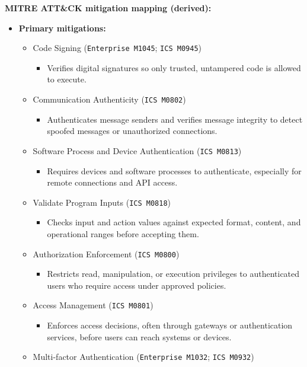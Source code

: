 \documentclass[10pt,a4paper,oneside]{report}
\begin{document}
\textbf{MITRE ATT\&CK mitigation mapping (derived):}

\begin{itemize}
\item \textbf{Primary mitigations:}
\begin{itemize}
\item Code Signing (\texttt{Enterprise M1045}; \texttt{ICS M0945})
\begin{itemize}
\item Verifies digital signatures so only trusted, untampered code is allowed to execute.
\end{itemize}
\item Communication Authenticity (\texttt{ICS M0802})
\begin{itemize}
\item Authenticates message senders and verifies message integrity to detect spoofed messages or unauthorized connections.
\end{itemize}
\item Software Process and Device Authentication (\texttt{ICS M0813})
\begin{itemize}
\item Requires devices and software processes to authenticate, especially for remote connections and API access.
\end{itemize}
\item Validate Program Inputs (\texttt{ICS M0818})
\begin{itemize}
\item Checks input and action values against expected format, content, and operational ranges before accepting them.
\end{itemize}
\item Authorization Enforcement (\texttt{ICS M0800})
\begin{itemize}
\item Restricts read, manipulation, or execution privileges to authenticated users who require access under approved policies.
\end{itemize}
\item Access Management (\texttt{ICS M0801})
\begin{itemize}
\item Enforces access decisions, often through gateways or authentication services, before users can reach systems or devices.
\end{itemize}
\item Multi-factor Authentication (\texttt{Enterprise M1032}; \texttt{ICS M0932})
\begin{itemize}

\end{itemize}
\end{itemize}
\end{itemize}
\end{document}
